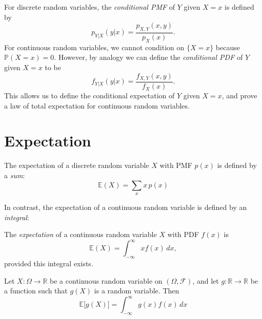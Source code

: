 \documentclass[lecture]{csm}
\newcommand{\prob}{\mathbb{P}}
\newcommand{\expe}{\mathbb{E}}
\newcommand{\R}{\mathbb{R}}
\newcommand{\proofomitted}{\par[\textit{Proof omitted.}]\par}
\begin{document}
\begin{remark}
For discrete random variables, the \emph{conditional PMF} of $Y$ given $X=x$ is defined by
\[
p_{Y|X}(y|x) = \frac{p_{X,Y}(x,y)}{p_X(x)}.
\]
For continuous random variables, we cannot condition on $\{X=x\}$ because $\prob(X=x)=0$. However, by analogy we can define the \emph{conditional PDF} of $Y$ given $X=x$ to be
\[
f_{Y|X}(y|x) = \frac{f_{X,Y}(x,y)}{f_X(x)}.
\]
This allows us to define the conditional expectation of $Y$ given $X=x$, and prove a law of total expectation for continuous random variables.
\end{remark}

%


\newpage
\section{Expectation}
The expectation of a discrete random variable $X$ with PMF $p(x)$ is defined by a \emph{sum}:
\[
\expe(X) = \sum_x x\,p(x)
\]

In contrast, the expectation of a continuous random variable is defined by an \emph{integral}:

\begin{definition}
The \emph{expectation} of a continuous random variable $X$ with PDF $f(x)$ is
\[
\expe(X) = \int_{-\infty}^{\infty} x f(x)\,dx,
\]
provided this integral exists.
\end{definition}

\newpage


\begin{theorem}\label{lem:law_unconscious_statistician_cts}
Let $X:\Omega\to\R$ be a continuous random variable on $(\Omega,\mathcal{F})$, and let $g:\R\to\R$ be a function such that $g(X)$ is a random variable. Then
\[
\expe\big[g(X)\big] = \int_{-\infty}^{\infty} g(x)f(x)\,dx
\]
\end{theorem}
\proofomitted
\end{document}
